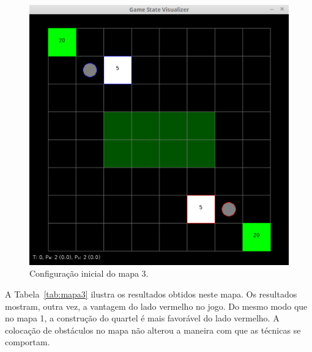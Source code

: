 \begin{figure}[ht]
	\centering
	\includegraphics[width=.5\textwidth]{fig/map8x8obsta.pdf}
	\caption{Configuração inicial do mapa 3.}
	\label{fig:mapa8x8obsta}
\end{figure}

A Tabela~\ref{tab:mapa3} ilustra os resultados obtidos neste mapa.
Os resultados mostram, outra vez, a vantagem do lado vermelho no jogo.
Do mesmo modo que no mapa 1, a construção do quartel é mais favorável do lado vermelho.
A colocação de obstáculos no mapa não alterou a maneira com que as técnicas se comportam.

